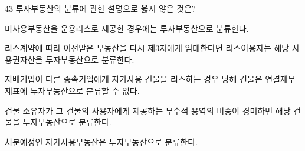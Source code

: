 \begin{question}{43}
투자부동산의 분류에 관한 설명으로 옳지 않은 것은?
\begin{choices}
  \item 미사용부동산을 운용리스로 제공한 경우에는 투자부동산으로 분류한다.
  \item 리스계약에 따라 이전받은 부동산을 다시 제3자에게 임대한다면 리스이용자는 해당 사용권자산을 투자부동산으로 분류한다.
  \item 지배기업이 다른 종속기업에게 자가사용 건물을 리스하는 경우 당해 건물은 연결재무제표에 투자부동산으로 분류할 수 없다.
  \item 건물 소유자가 그 건물의 사용자에게 제공하는 부수적 용역의 비중이 경미하면 해당 건물을 투자부동산으로 분류한다.
  \item 처분예정인 자가사용부동산은 투자부동산으로 분류한다.
\end{choices}
\end{question}
